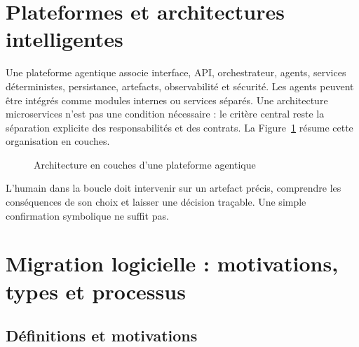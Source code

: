 \section{Plateformes et architectures intelligentes}

Une plateforme agentique associe interface, API, orchestrateur, agents, services déterministes, persistance, artefacts, observabilité et sécurité. Les agents peuvent être intégrés comme modules internes ou services séparés. Une architecture microservices n'est pas une condition nécessaire : le critère central reste la séparation explicite des responsabilités et des contrats. La Figure~\ref{fig:plateforme-agentique-ch2} résume cette organisation en couches.

\begin{figure}[H]
    \centering
    \caption{Architecture en couches d'une plateforme agentique}
    \label{fig:plateforme-agentique-ch2}
\end{figure}

L'humain dans la boucle doit intervenir sur un artefact précis, comprendre les conséquences de son choix et laisser une décision traçable. Une simple confirmation symbolique ne suffit pas.

\section{Migration logicielle : motivations, types et processus}

\subsection{Définitions et motivations}

